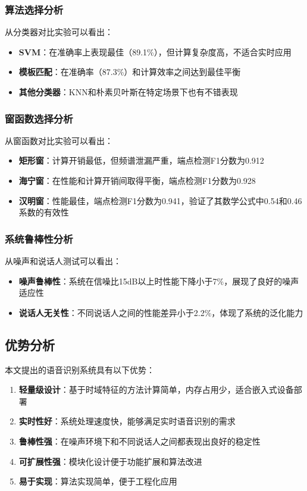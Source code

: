 \documentclass[sigconf,nonacm]{acmart}
\begin{document}
\subsubsection{算法选择分析}

从分类器对比实验可以看出：
\begin{itemize}
\item \textbf{SVM}：在准确率上表现最佳（89.1\%），但计算复杂度高，不适合实时应用
\item \textbf{模板匹配}：在准确率（87.3\%）和计算效率之间达到最佳平衡
\item \textbf{其他分类器}：KNN和朴素贝叶斯在特定场景下也有不错表现
\end{itemize}

\subsubsection{窗函数选择分析}

从窗函数对比实验可以看出：
\begin{itemize}
\item \textbf{矩形窗}：计算开销最低，但频谱泄漏严重，端点检测F1分数为0.912
\item \textbf{海宁窗}：在性能和计算开销间取得平衡，端点检测F1分数为0.928
\item \textbf{汉明窗}：性能最佳，端点检测F1分数为0.941，验证了其数学公式中0.54和0.46系数的有效性
\end{itemize}

\subsubsection{系统鲁棒性分析}

从噪声和说话人测试可以看出：
\begin{itemize}
\item \textbf{噪声鲁棒性}：系统在信噪比15dB以上时性能下降小于7\%，展现了良好的噪声适应性
\item \textbf{说话人无关性}：不同说话人之间的性能差异小于2.2\%，体现了系统的泛化能力
\end{itemize}

\subsection{优势分析}

本文提出的语音识别系统具有以下优势：

\begin{enumerate}
\item \textbf{轻量级设计}：基于时域特征的方法计算简单，内存占用少，适合嵌入式设备部署
\item \textbf{实时性好}：系统处理速度快，能够满足实时语音识别的需求
\item \textbf{鲁棒性强}：在噪声环境下和不同说话人之间都表现出良好的稳定性
\item \textbf{可扩展性强}：模块化设计便于功能扩展和算法改进
\item \textbf{易于实现}：算法实现简单，便于工程化应用
\end{enumerate}
\end{document}
